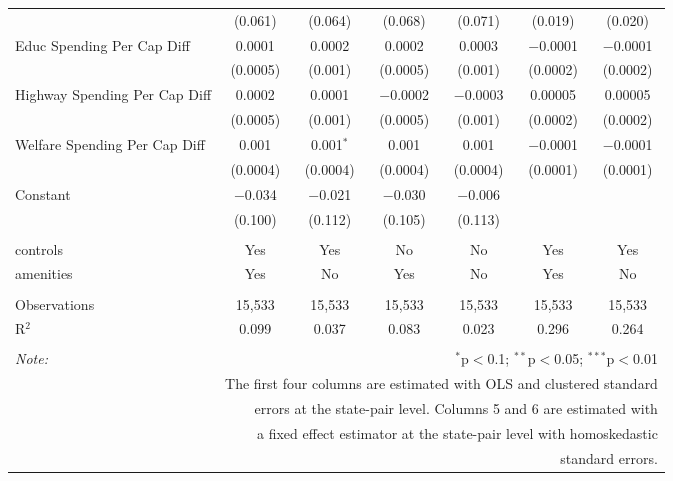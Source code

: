 \begin{table}[!htbp]
\begin{tabular}{@{\extracolsep{5pt}}lcccccc}
  & (0.061) & (0.064) & (0.068) & (0.071) & (0.019) & (0.020) \\ 
  Educ Spending Per Cap Diff & 0.0001 & 0.0002 & 0.0002 & 0.0003 & $-$0.0001 & $-$0.0001 \\ 
  & (0.0005) & (0.001) & (0.0005) & (0.001) & (0.0002) & (0.0002) \\ 
  Highway Spending Per Cap Diff & 0.0002 & 0.0001 & $-$0.0002 & $-$0.0003 & 0.00005 & 0.00005 \\ 
  & (0.0005) & (0.001) & (0.0005) & (0.001) & (0.0002) & (0.0002) \\ 
  Welfare Spending Per Cap Diff & 0.001 & 0.001$^{*}$ & 0.001 & 0.001 & $-$0.0001 & $-$0.0001 \\ 
  & (0.0004) & (0.0004) & (0.0004) & (0.0004) & (0.0001) & (0.0001) \\ 
  Constant & $-$0.034 & $-$0.021 & $-$0.030 & $-$0.006 &  &  \\ 
  & (0.100) & (0.112) & (0.105) & (0.113) &  &  \\ 
 \hline \\[-1.8ex] 
controls & Yes & Yes & No & No & Yes & Yes \\ 
amenities & Yes & No & Yes & No & Yes & No \\ 
\hline \\[-1.8ex] 
Observations & 15,533 & 15,533 & 15,533 & 15,533 & 15,533 & 15,533 \\ 
R$^{2}$ & 0.099 & 0.037 & 0.083 & 0.023 & 0.296 & 0.264 \\ 
\hline 
\hline \\[-1.8ex] 
\textit{Note:}  & \multicolumn{6}{r}{$^{*}$p$<$0.1; $^{**}$p$<$0.05; $^{***}$p$<$0.01} \\ 
 & \multicolumn{6}{r}{The first four columns are estimated with OLS and clustered standard} \\ 
 & \multicolumn{6}{r}{ errors at the state-pair level. Columns 5 and 6 are estimated with} \\ 
 & \multicolumn{6}{r}{a fixed effect estimator at the state-pair level with homoskedastic} \\ 
 & \multicolumn{6}{r}{standard errors.} \\ 
\end{tabular} 
\end{table} 
